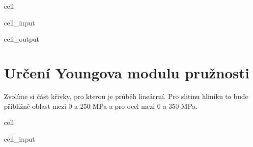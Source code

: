\documentclass[letterpaper,10pt,english]{jupyterBook}
\begin{document}
{{\begin{sphinxuseclass}{cell}
\begin{sphinxVerbatimInput}
\begin{sphinxuseclass}{cell_input}
\begin{sphinxVerbatim}[commandchars=\\\{\}]

 
\end{sphinxVerbatim}

\end{sphinxuseclass}\end{sphinxVerbatimInput}
\begin{sphinxVerbatimOutput}

\begin{sphinxuseclass}{cell_output}
\noindent{}

\end{sphinxuseclass}\end{sphinxVerbatimOutput}

\end{sphinxuseclass}

\section{Určení Youngova modulu pružnosti}
\label{\detokenize{Prednasky/2_7_P_u0159_xedklad _tahov_xe9_zkou_u0161ky:urceni-youngova-modulu-pruznosti}}
\sphinxAtStartPar
Zvolíme si část křivky, pro kterou je průběh lineárrní. Pro slitinu hliníku to bude přibližně oblast mezi 0 a 250 MPa a pro ocel mezi 0 a 350 MPa.

\begin{sphinxuseclass}{cell}\begin{sphinxVerbatimInput}

\begin{sphinxuseclass}{cell_input}
\begin{sphinxVerbatim}[commandchars=\\\{\}]
  \PYG{p}{[}\PYG{p}{]}
  \PYG{p}{[}\PYG{p}{]}


\end{sphinxVerbatim}
\end{sphinxuseclass}
\end{sphinxVerbatimInput}
\end{sphinxuseclass}}}
\end{document}
